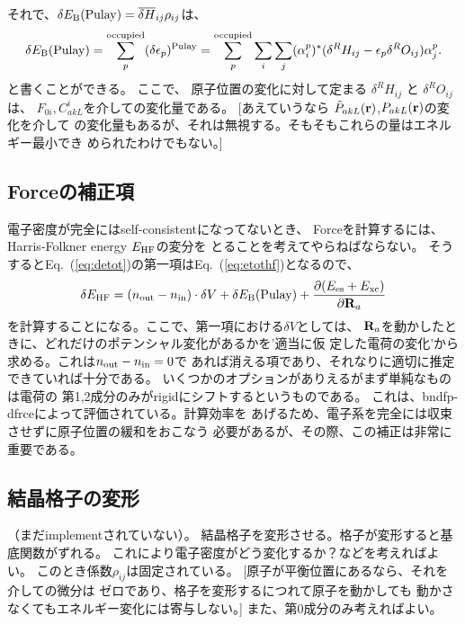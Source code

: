 \documentclass[a4paper,10pt,aip,onecolumn,amsmath,amssymb,floatfix,rmp]{revtex4-1}
\newcommand{\bfr}{{\bf r}}
\newcommand{\bfR}{{\bf R}}
\newcommand{\req}[1]{\mbox{Eq.~\!(\ref{#1})}}
\begin{document}
それで、$\delta E_{\rm B}({\rm Pulay}) = \overline{\delta H}_{ij} \rho_{ij}$は、
\begin{eqnarray}
\delta E_{\rm B}({\rm Pulay}) = \sum_p^{\rm occupied}
 (\delta\epsilon_p)^{\rm Pulay}
=\sum_p^{\rm occupied} \sum_i \sum_j 
(\alpha^p_i)^* (\delta^R H_{ij} -\epsilon_p \delta^RO_{ij}) \alpha^p_j.
\end{eqnarray}
と書くことができる。
ここで、 原子位置の変化に対して定まる
$\delta^R H_{ij}$ と $\delta^R O_{ij}$ は、
$F_{0i},C^{i}_{akL}$を介しての変化量である。
[あえていうなら $\tilde{P}_{akL}(\bfr)$,${P}_{akL}(\bfr)$の変化を介して
の変化量もあるが、それは無視する。そもそもこれらの量はエネルギー最小でき
められたわけでもない。]

\subsection{Forceの補正項}
電子密度が完全にはself-consistentになってないとき、
Forceを計算するには、Harris-Folkner energy $E_{\rm HF}$の変分を
とることを考えてやらねばならない。
そうすると\req{eq:detot}の第一項は\req{eq:etothf}となるので、
\begin{eqnarray}
\delta E_{\rm HF} = (n_{\rm out}-n_{\rm in})\cdot \delta V
+\delta E_{\rm B}({\rm Pulay}) 
+\frac{\partial (E_{\rm es} + E_{\rm xc})}{\partial \bfR_a}
\end{eqnarray}
を計算することになる。ここで、第一項における$\delta V$としては、
$\bfR_a$を動かしたときに、どれだけのポテンシャル変化があるかを'適当に仮
定した電荷の変化'から求める。これは$n_{\rm out}-n_{\rm in}=0$で
あれば消える項であり、それなりに適切に推定できていれば十分である。
いくつかのオプションがありえるがまず単純なものは電荷の
第1,2成分のみがrigidにシフトするというものである。
これは、bndfp-dfrceによって評価されている。計算効率を
あげるため、電子系を完全には収束させずに原子位置の緩和をおこなう
必要があるが、その際、この補正は非常に重要である。


\subsection{結晶格子の変形}
（まだimplementされていない）。
結晶格子を変形させる。格子が変形すると基底関数がずれる。
これにより電子密度がどう変化するか？などを考えればよい。
このとき係数$\rho_{ij}$は固定されている。
[原子が平衡位置にあるなら、それを介しての微分は
ゼロであり、格子を変形するにつれて原子を動かしても
動かさなくてもエネルギー変化には寄与しない。]
また、第0成分のみ考えればよい。
\end{document}
